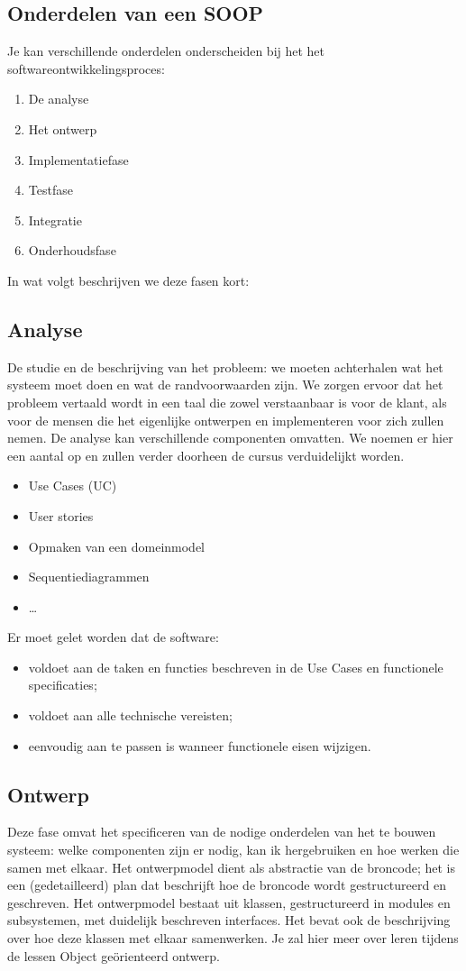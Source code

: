 \subsection{Onderdelen van een SOOP}
Je kan verschillende onderdelen onderscheiden bij het het softwareontwikkelingsproces:
\begin{enumerate}
	\item De analyse
	\item Het ontwerp
	\item Implementatiefase
	\item Testfase
	\item Integratie
	\item Onderhoudsfase
\end{enumerate}

In wat volgt beschrijven we deze fasen kort:

\subsection{Analyse}
De studie en de beschrijving van het probleem: we moeten achterhalen wat het systeem moet doen en wat de randvoorwaarden zijn. We zorgen ervoor dat het probleem vertaald wordt in een taal die zowel verstaanbaar is voor de klant, als voor de mensen die het eigenlijke ontwerpen en implementeren voor zich zullen nemen. De analyse kan  verschillende componenten omvatten. We noemen er hier een aantal op en zullen verder doorheen de cursus verduidelijkt worden.
\begin{itemize}
	\item Use Cases (UC)
	\item User stories
	\item Opmaken van een domeinmodel
	\item Sequentiediagrammen
	\item \dots
\end{itemize}

Er moet gelet worden dat de software:
\begin{itemize}
	\item voldoet aan de taken en functies beschreven in de Use Cases en functionele specificaties;
	\item voldoet aan alle technische vereisten; 
	\item eenvoudig aan te passen is wanneer functionele eisen wijzigen.
\end{itemize}

\subsection{Ontwerp}
Deze fase omvat het specificeren van de nodige onderdelen van het te bouwen systeem: welke componenten zijn er nodig, kan ik hergebruiken en hoe werken die samen met elkaar. 
Het ontwerpmodel dient als abstractie van de broncode; het is een (gedetailleerd) plan dat beschrijft hoe de broncode wordt gestructureerd en geschreven. Het ontwerpmodel bestaat uit klassen, gestructureerd in modules en subsystemen, met duidelijk beschreven interfaces. Het bevat ook de beschrijving over hoe deze klassen met elkaar samenwerken. Je zal hier meer over leren tijdens de lessen Object ge\"orienteerd ontwerp.


